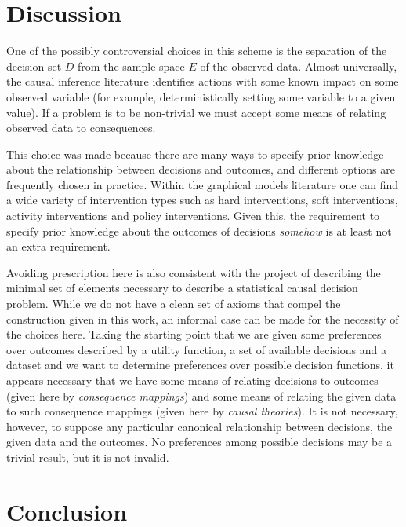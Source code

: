 \documentclass{article}
\theoremstyle{plain}
\theoremstyle{definition}
\begin{document}






\section{Discussion}

One of the possibly controversial choices in this scheme is the separation of the decision set $D$ from the sample space $E$ of the observed data. Almost universally, the causal inference literature identifies actions with some known impact on some observed variable (for example, deterministically setting some variable to a given value). If a problem is to be non-trivial we must accept some means of relating observed data to consequences.

This choice was made because there are many ways to specify prior knowledge about the relationship between decisions and outcomes, and different options are frequently chosen in practice. Within the graphical models literature one can find a wide variety of intervention types such as hard interventions, soft interventions, activity interventions and policy interventions. Given this, the requirement to specify prior knowledge about the outcomes of decisions \emph{somehow} is at least not an extra requirement.

Avoiding prescription here is also consistent with the project of describing the minimal set of elements necessary to describe a statistical causal decision problem. While we do not have a clean set of axioms that compel the construction given in this work, an informal case can be made for the necessity of the choices here. Taking the starting point that we are given some preferences over outcomes described by a utility function, a set of available decisions and a dataset and we want to determine preferences over possible decision functions, it appears necessary that we have some means of relating decisions to outcomes (given here by \emph{consequence mappings}) and some means of relating the given data to such consequence mappings (given here by \emph{causal theories}). It is not necessary, however, to suppose any particular canonical relationship between decisions, the given data and the outcomes. No preferences among possible decisions may be a trivial result, but it is not invalid.



\section{Conclusion}










\end{document}
